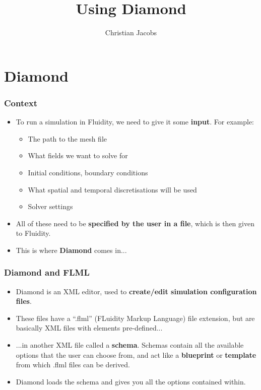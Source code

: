 \documentclass[12pt]{beamer}
\title[Diamond]{Using Diamond}
\subtitle[]{}
\institute{}
\author[Christian Jacobs]{\large{Christian Jacobs}}
\date{}
\begin{document}
\begin{frame}
  \titlepage
\end{frame}


\section{Diamond}

\begin{frame}
    \frametitle{Context}
\begin{itemize}
    \item To run a simulation in Fluidity, we need to give it some \textbf{input}. For example:
    \begin{itemize}
      \item The path to the mesh file
      \item What fields we want to solve for
      \item Initial conditions, boundary conditions
      \item What spatial and temporal discretisations will be used
      \item Solver settings
    \end{itemize}
    \item All of these need to be \textbf{specified by the user in a file}, which is then given to Fluidity.
    \item This is where \textbf{Diamond} comes in...
\end{itemize}
\end{frame}

\begin{frame}
    \frametitle{Diamond and FLML}
\begin{itemize}
    \item Diamond is an XML editor, used to \textbf{create/edit simulation configuration files}.
    \item These files have a ``.flml'' (FLuidity Markup Language) file extension, but are basically XML files with elements pre-defined...
    \item ...in another XML file called a \textbf{schema}. Schemas contain all the available options that the user can choose from, and act like a \textbf{blueprint} or \textbf{template} from which .flml files can be derived.
    \newline
    \item Diamond loads the schema and gives you all the options contained within.
\end{itemize}
\end{frame}
\end{document}
